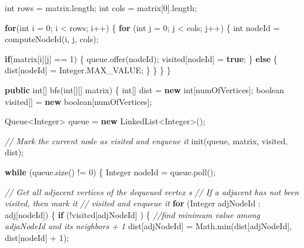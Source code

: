 \documentclass[]{book}
\newenvironment{Shaded}{\begin{snugshade}}{\end{snugshade}}
\newcommand{\BuiltInTok}[1]{#1}
\newcommand{\CommentTok}[1]{\textcolor[rgb]{0.56,0.35,0.01}{\textit{#1}}}
\newcommand{\DataTypeTok}[1]{\textcolor[rgb]{0.13,0.29,0.53}{#1}}
\newcommand{\DecValTok}[1]{\textcolor[rgb]{0.00,0.00,0.81}{#1}}
\newcommand{\FunctionTok}[1]{\textcolor[rgb]{0.00,0.00,0.00}{#1}}
\newcommand{\KeywordTok}[1]{\textcolor[rgb]{0.13,0.29,0.53}{\textbf{#1}}}
\newcommand{\NormalTok}[1]{#1}
\begin{document}
\begin{Shaded}
\begin{Highlighting}[]
        \DataTypeTok{int}\NormalTok{ rows = matrix.}\FunctionTok{length}\NormalTok{;}
        \DataTypeTok{int}\NormalTok{ cols = matrix[}\DecValTok{0}\NormalTok{].}\FunctionTok{length}\NormalTok{;}

        \KeywordTok{for}\NormalTok{(}\DataTypeTok{int}\NormalTok{ i = }\DecValTok{0}\NormalTok{; i < rows; i++) \{}
            \KeywordTok{for}\NormalTok{ (}\DataTypeTok{int}\NormalTok{ j = }\DecValTok{0}\NormalTok{; j < cols; j++) \{}
                \DataTypeTok{int}\NormalTok{ nodeId = }\FunctionTok{computeNodeId}\NormalTok{(i, j, cols);}

                \KeywordTok{if}\NormalTok{(matrix[i][j] == }\DecValTok{1}\NormalTok{) \{}
\NormalTok{                    queue.}\FunctionTok{offer}\NormalTok{(nodeId);}
\NormalTok{                    visited[nodeId] = }\KeywordTok{true}\NormalTok{;}
\NormalTok{                \} }\KeywordTok{else}\NormalTok{ \{}
\NormalTok{                    dist[nodeId] = }\BuiltInTok{Integer}\NormalTok{.}\FunctionTok{MAX_VALUE}\NormalTok{;}
\NormalTok{                \}}
\NormalTok{            \}}
\NormalTok{        \}}
\NormalTok{    \}}

    \KeywordTok{public} \DataTypeTok{int}\NormalTok{[] }\FunctionTok{bfs}\NormalTok{(}\DataTypeTok{int}\NormalTok{[][] matrix) \{}
        \DataTypeTok{int}\NormalTok{[] dist = }\KeywordTok{new} \DataTypeTok{int}\NormalTok{[numOfVertices];}
        \DataTypeTok{boolean}\NormalTok{ visited[] = }\KeywordTok{new} \DataTypeTok{boolean}\NormalTok{[numOfVertices];}

        \BuiltInTok{Queue}\NormalTok{<}\BuiltInTok{Integer}\NormalTok{> queue = }\KeywordTok{new} \BuiltInTok{LinkedList}\NormalTok{<}\BuiltInTok{Integer}\NormalTok{>();}

        \CommentTok{// Mark the current node as visited and enqueue it}
        \FunctionTok{init}\NormalTok{(queue, matrix, visited, dist);}

        \KeywordTok{while}\NormalTok{ (queue.}\FunctionTok{size}\NormalTok{() != }\DecValTok{0}\NormalTok{) \{}
            \BuiltInTok{Integer}\NormalTok{ nodeId = queue.}\FunctionTok{poll}\NormalTok{();}

            \CommentTok{// Get all adjacent vertices of the dequeued vertex s}
            \CommentTok{// If a adjacent has not been visited, then mark it}
            \CommentTok{// visited and enqueue it}
            \KeywordTok{for}\NormalTok{ (}\BuiltInTok{Integer}\NormalTok{ adjNodeId : adj[nodeId]) \{}
                \KeywordTok{if}\NormalTok{ (!visited[adjNodeId] ) \{}
                    \CommentTok{//find minimum value among adjaNodeId and its neighbors + 1}
\NormalTok{                    dist[adjNodeId] = }\BuiltInTok{Math}\NormalTok{.}\FunctionTok{min}\NormalTok{(dist[adjNodeId], dist[nodeId] + }\DecValTok{1}\NormalTok{);}


\end{Highlighting}
\end{Shaded}
\end{document}

